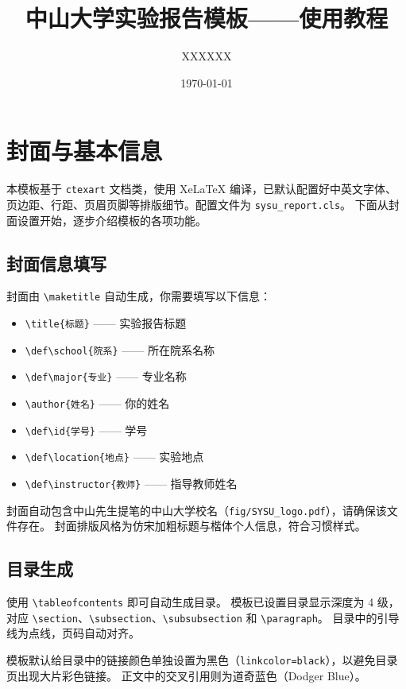 \documentclass{sysu_report}
\title{中山大学实验报告模板——使用教程}
\author{XXXXXX}                   %
\date{\today}
\def\school{XXXXXX} %
\def\major{XXXXXX}  %
\def\id{20260000000}            %
\def\location{XXXXXX}    %
\def\instructor{XXXXXX}           %
\begin{document}
\maketitle
{
\hypersetup{linkcolor=black}
\setlength{\parskip}{0pt}
\tableofcontents
}
\clearpage
\setcounter{page}{1}
\renewcommand{\thepage}{\arabic{page}}
\maintext%
\section{封面与基本信息}
本模板基于 \texttt{ctexart} 文档类，使用 XeLaTeX 编译，已默认配置好中英文字体、页边距、行距、页眉页脚等排版细节。配置文件为 \texttt{sysu\_report.cls}。
下面从封面设置开始，逐步介绍模板的各项功能。\par
\subsection{封面信息填写}
封面由 \verb|\maketitle| 自动生成，你需要填写以下信息：\par
\begin{itemize}
    \item \verb|\title{标题}| —— 实验报告标题
    \item \verb|\def\school{院系}| —— 所在院系名称
    \item \verb|\def\major{专业}| —— 专业名称
    \item \verb|\author{姓名}| —— 你的姓名
    \item \verb|\def\id{学号}| —— 学号
    \item \verb|\def\location{地点}| —— 实验地点
    \item \verb|\def\instructor{教师}| —— 指导教师姓名
\end{itemize}\par
封面自动包含中山先生提笔的中山大学校名（\texttt{fig/SYSU\_logo.pdf}），请确保该文件存在。
封面排版风格为仿宋加粗标题与楷体个人信息，符合习惯样式。\par
\subsection{目录生成}
使用 \verb|\tableofcontents| 即可自动生成目录。
模板已设置目录显示深度为 4 级，对应 \verb|\section|、\verb|\subsection|、\verb|\subsubsection| 和 \verb|\paragraph|。
目录中的引导线为点线，页码自动对齐。\par
模板默认给目录中的链接颜色单独设置为黑色（\verb|linkcolor=black|），以避免目录页出现大片彩色链接。
正文中的交叉引用则为道奇蓝色（Dodger Blue）。
\end{document}
